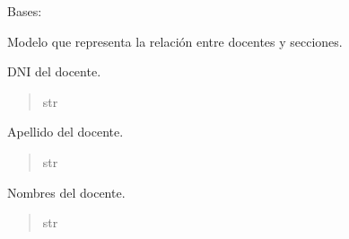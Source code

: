 \documentclass[letterpaper,10pt,spanish]{sphinxmanual}
\begin{document}
\begin{fulllineitems}

\pysigstartsignatures
{}
\pysigstopsignatures
\sphinxAtStartPar
Bases: 

\sphinxAtStartPar
Modelo que representa la relación entre docentes y secciones.


\begin{fulllineitems}

\pysigstartsignatures
{}
\pysigstopsignatures
\sphinxAtStartPar
DNI del docente.
\begin{quote}\begin{description}
\sphinxAtStartPar
str

\end{description}\end{quote}

\end{fulllineitems}



\begin{fulllineitems}

\pysigstartsignatures
{}
\pysigstopsignatures
\sphinxAtStartPar
Apellido del docente.
\begin{quote}\begin{description}
\sphinxAtStartPar
str

\end{description}\end{quote}

\end{fulllineitems}



\begin{fulllineitems}

\pysigstartsignatures
{}
\pysigstopsignatures
\sphinxAtStartPar
Nombres del docente.
\begin{quote}\begin{description}
\sphinxAtStartPar
str

\end{description}\end{quote}


\end{fulllineitems}
\end{fulllineitems}
\end{document}
